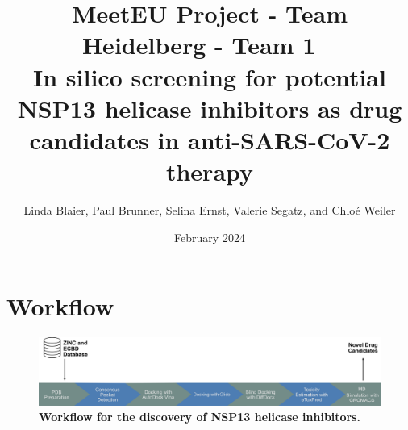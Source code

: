 \documentclass[11pt, letterpaper, titlepage]{article}
\title{MeetEU Project - Team Heidelberg - Team 1 -- \\ In silico screening for potential NSP13 helicase inhibitors as drug candidates in anti-SARS-CoV-2 therapy}
\author{Linda Blaier, Paul Brunner, Selina Ernst, Valerie Segatz, and Chlo\'{e} Weiler}
\date{February 2024}
\begin{document}
\maketitle

\ihead{\headmark}
\cfoot{\pagemark}   %

\section{Workflow}

\begin{figure}[h]
  \centering
  \includegraphics[width=\textwidth]{Workflow_MeetEU.pdf}
  \caption*{\textbf{Workflow for the discovery of NSP13 helicase inhibitors.}}
  \label{workflow}
\end{figure}

\setcounter{figure}{0}
\renewcommand{\thefigure}{\arabic{figure}}
\end{document}
